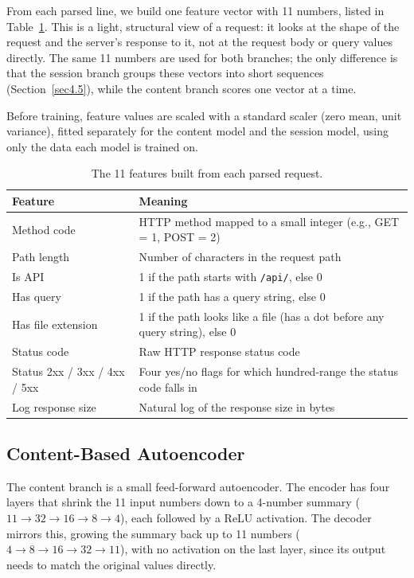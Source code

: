 \documentclass[futureinternet,article,accept,moreauthors]{Definitions/mdpi}
\begin{document}
From each parsed line, we build one feature vector with 11 numbers, listed in Table~\ref{tab:features}. This is a light, structural view of a request: it looks at the shape of the request and the server's response to it, not at the request body or query values directly. The same 11 numbers are used for both branches; the only difference is that the session branch groups these vectors into short sequences (Section~\ref{sec4.5}), while the content branch scores one vector at a time.

Before training, feature values are scaled with a standard scaler (zero mean, unit variance), fitted separately for the content model and the session model, using only the data each model is trained on.

\begin{table}[H]
\caption{The 11 features built from each parsed request.}
\label{tab:features}
\begin{tabularx}{\textwidth}{lX}
\toprule
\textbf{Feature} & \textbf{Meaning} \\
\midrule
Method code & HTTP method mapped to a small integer (e.g., GET = 1, POST = 2) \\
Path length & Number of characters in the request path \\
Is API & 1 if the path starts with \texttt{/api/}, else 0 \\
Has query & 1 if the path has a query string, else 0 \\
Has file extension & 1 if the path looks like a file (has a dot before any query string), else 0 \\
Status code & Raw HTTP response status code \\
Status 2xx / 3xx / 4xx / 5xx & Four yes/no flags for which hundred-range the status code falls in \\
Log response size & Natural log of the response size in bytes \\
\bottomrule
\end{tabularx}
\end{table}

\subsection{Content-Based Autoencoder}

The content branch is a small feed-forward autoencoder. The encoder has four layers that shrink the 11 input numbers down to a 4-number summary ($11 \rightarrow 32 \rightarrow 16 \rightarrow 8 \rightarrow 4$), each followed by a ReLU activation. The decoder mirrors this, growing the summary back up to 11 numbers ($4 \rightarrow 8 \rightarrow 16 \rightarrow 32 \rightarrow 11$), with no activation on the last layer, since its output needs to match the original values directly.
\end{document}
